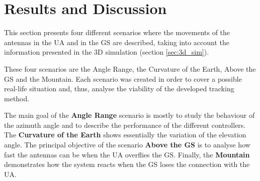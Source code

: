 \chapter{Results and Discussion}\label{ch:results}

This section presents four different scenarios where the movements of the antennas in the UA and in the GS are described, taking into account the information presented in the 3D simulation (section \ref{sec:3d_sim}).

These four scenarios are the Angle Range, the Curvature of the Earth, Above the GS and the Mountain. Each scenario was created in order to cover a possible real-life situation and, thus, analyse the viability of the developed tracking method.

The main goal of the \textbf{Angle Range} scenario is mostly to study the behaviour of the azimuth angle and to describe the performance of the different controllers. The \textbf{Curvature of the Earth} shows essentially the variation of the elevation angle. The principal objective of the scenario \textbf{Above the GS} is to analyse how fast the antennas can be when the UA overflies the GS. Finally, the \textbf{Mountain} demonstrates how the system reacts when the GS loses the connection with the UA. 